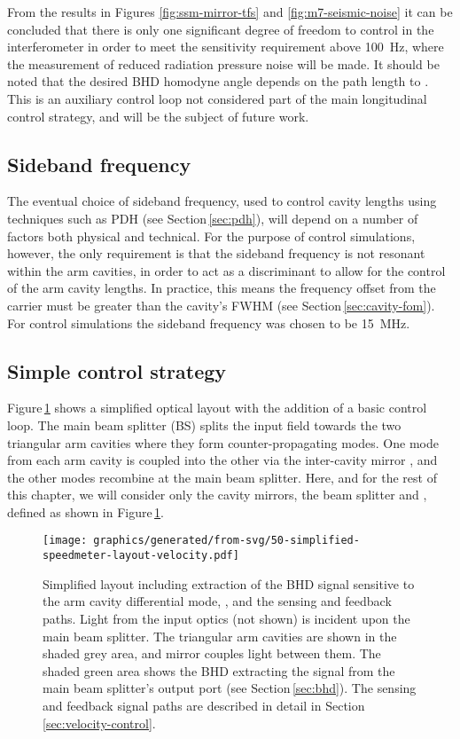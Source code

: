 From the results in Figures \ref{fig:ssm-mirror-tfs} and \ref{fig:m7-seismic-noise} it can be concluded that there is only one significant degree of freedom to control in the interferometer in order to meet the sensitivity requirement above \SI{100}{\hertz}, where the measurement of reduced radiation pressure noise will be made. It should be noted that the desired \gls{BHD} homodyne angle depends on the path length \MELEVEN{} to \MSIXTEEN{}. This is an auxiliary control loop not considered part of the main longitudinal control strategy, and will be the subject of future work.

\subsection{Sideband frequency}
The eventual choice of sideband frequency, used to control cavity lengths using techniques such as \gls{PDH} (see Section\,\ref{sec:pdh}), will depend on a number of factors both physical and technical. For the purpose of control simulations, however, the only requirement is that the sideband frequency is not resonant within the arm cavities, in order to act as a discriminant to allow for the control of the arm cavity lengths. In practice, this means the frequency offset from the carrier must be greater than the cavity's \gls{FWHM} (see Section\,\ref{sec:cavity-fom}). For control simulations the sideband frequency was chosen to be \SI{15}{\mega\hertz}.

\subsection{\label{sec:velocity-control}Simple control strategy}
Figure\,\ref{fig:simplified-speedmeter-layout-velocity} shows a simplified optical layout with the addition of a basic control loop. The main beam splitter (BS) splits the input field towards the two triangular arm cavities where they form counter-propagating modes. One mode from each arm cavity is coupled into the other via the inter-cavity mirror \MINT{}, and the other modes recombine at the main beam splitter. Here, and for the rest of this chapter, we will consider only the cavity mirrors, the beam splitter and \MINT{}, defined as shown in Figure\,\ref{fig:simplified-speedmeter-layout-velocity}.

\begin{figure}
  \centering
  \texttt{[image: graphics/generated/from-svg/50-simplified-speedmeter-layout-velocity.pdf]}
  \caption[Simplified layout of the \SSMEXPT{} including a basic velocity feedback loop]{\label{fig:simplified-speedmeter-layout-velocity}Simplified \SSM{} layout including extraction of the BHD signal sensitive to the arm cavity differential mode, \LMINUS{}, and the sensing and feedback paths. Light from the input optics (not shown) is incident upon the main beam splitter. The triangular arm cavities are shown in the shaded grey area, and mirror \MINT{} couples light between them. The shaded green area shows the BHD extracting the signal from the main beam splitter's output port (see Section\,\ref{sec:bhd}). The sensing and feedback signal paths are described in detail in Section\,\ref{sec:velocity-control}.}
\end{figure}

